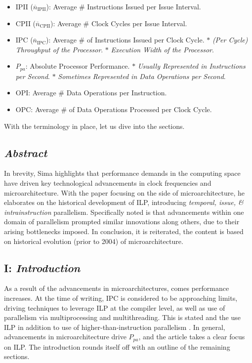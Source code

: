 \documentclass{article}
\begin{document}
\begin{itemize}
    \item IPII (\(\overline{n}_\text{IPII}\)): Average \# Instructions Issued per Issue Interval.
    \item CPII (\(\overline{n}_\text{CPII}\)): Average \# Clock Cycles per Issue Interval.
    \item IPC (\(\overline{n}_\text{IPC}\)): Average \# of Instructions Issued per Clock Cycle.
    \subitem \(\ast\) \emph{(Per Cycle) Throughput of the Processor}.
    \subitem \(\ast\) \emph{Execution Width of the Processor}.
    \item \(P_{pa}\): Absolute Processor Performance.
    \subitem \(\ast\) \emph{Usually Represented in Instructions per Second}.
    \subitem \(\ast\) \emph{Sometimes Represented in Data Operations per Second}.
    \item OPI: Average \# Data Operations per Instruction.
    \item OPC: Average \# of Data Operations Processed per Clock Cycle.
\end{itemize}
With the terminology in place, let us dive into the sections. 

\subsection{\emph{Abstract}}
In brevity, Sima highlights that performance demands in the computing space have driven key technological advancements in clock frequencies and microarchitecture. 
With the paper focusing on the side of microarchitecture, he elaborates on the historical development of ILP, introducing \emph{temporal, issue, \& intrainstruction} parallelism. 
Specifically noted is that advancements within one domain of parallelism prompted similar innovations along others, due to their arising bottlenecks imposed. 
In conclusion, it is reiterated, the content is based on historical evolution (prior to 2004) of microarchitecture.

\subsection{\textbf{I}: \emph{Introduction}}
As a result of the advancements in microarchitectures, comes performance increases. 
At the time of writing, IPC is considered to be approaching limits, driving techniques to leverage ILP at the compiler level, as well as use of parallelism via multiprocessing and multithreading. 
This is stated and the use ILP in addition to use of higher-than-instruction parallelism \cite{Sima}. 
In general, advancements in microarchitecture drive \(P_{pa}\), and the article takes a clear focus on ILP. 
The introduction rounds itself off with an outline of the remaining sections. 
\end{document}
